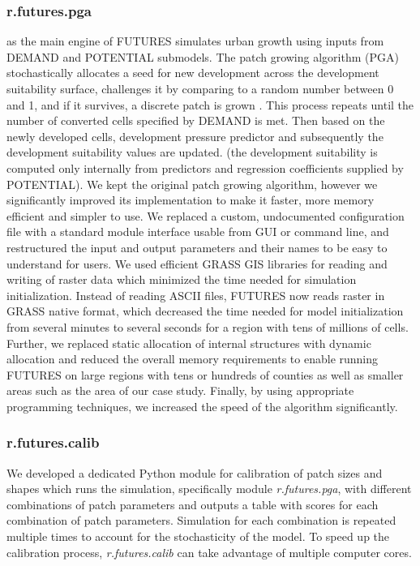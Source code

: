 \documentclass{isprs}
\begin{document}
\subsubsection{r.futures.pga}
as the main engine of FUTURES simulates urban growth using inputs from
DEMAND and POTENTIAL submodels.
The patch growing algorithm (PGA) stochastically allocates
a seed for new development across the development suitability surface,
challenges it by comparing to a random number between 0 and 1, and
if it survives, a discrete patch is grown \cite{Meentemeyer2012}. This process repeats
until the number of converted cells specified by DEMAND is met.
Then based on the newly developed cells, development pressure predictor and subsequently
the development suitability values are updated.
(the development suitability is computed only internally
from predictors and regression coefficients supplied by POTENTIAL).
We kept the original patch growing algorithm,
however we significantly improved its implementation to make it
faster, more memory efficient and simpler to use.
We replaced a custom, undocumented configuration file with a standard module interface
usable from GUI or command line, and restructured the input and output
parameters and their names to be easy to understand for users.
We used efficient GRASS GIS libraries for reading and writing of raster data
which minimized the time needed for simulation initialization.
Instead of reading ASCII files, FUTURES now reads raster in GRASS native format,
which decreased the time needed for model initialization from several minutes to several seconds
for a region with tens of millions of cells.
Further, we replaced static allocation of internal structures with dynamic allocation
and reduced the overall memory requirements to
enable running FUTURES on large regions with tens or hundreds of counties
as well as smaller areas such as the area of our case study.
Finally, by using appropriate programming techniques, we increased the
speed of the algorithm significantly.


\subsubsection{r.futures.calib}
We developed a dedicated Python module for calibration of patch sizes and shapes
which runs the simulation, specifically module \emph{r.futures.pga},
with different combinations of patch parameters and outputs a table
with scores for each combination of patch parameters. Simulation for each combination is repeated
multiple times to account for the stochasticity of the model.
To speed up the calibration process, \emph{r.futures.calib} can take advantage of multiple
computer cores.
\end{document}
